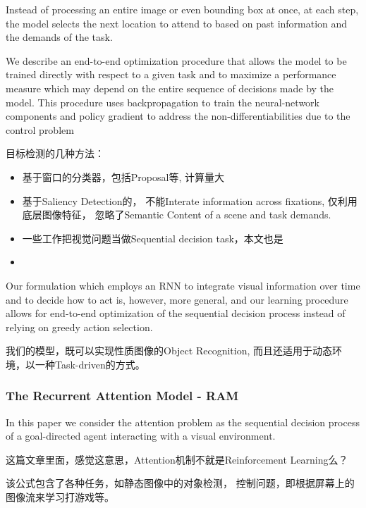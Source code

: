 Instead of processing an entire image or even bounding box at once, at each step, the model
selects the next location to attend to based on past information and the demands of the task.

We describe an end-to-end
optimization procedure that allows the model to be trained directly with respect to a given task and
to maximize a performance measure which may depend on the entire sequence of decisions made by
the model. This procedure uses backpropagation to train the neural-network components and policy
gradient to address the non-differentiabilities due to the control problem

目标检测的几种方法：
\begin{itemize}
\item 基于窗口的分类器，包括Proposal等, 计算量大
\item 基于Saliency Detection的， 不能Interate information across fixations, 仅利用底层图像特征， 忽略了Semantic Content of a scene and task demands.
\item 一些工作把视觉问题当做Sequential decision task，本文也是
\item 
\end{itemize}

Our formulation which employs an RNN to integrate visual
information over time and to decide how to act is, however, more general, and our learning procedure
allows for end-to-end optimization of the sequential decision process instead of relying on greedy
action selection.

我们的模型，既可以实现性质图像的Object Recognition, 而且还适用于动态环境，以一种Task-driven的方式。

\subsubsection{The Recurrent Attention Model - RAM }

In this paper we consider the attention problem as the sequential decision process of a goal-directed
agent interacting with a visual environment.

这篇文章里面，感觉这意思，Attention机制不就是Reinforcement Learning么？

该公式包含了各种任务，如静态图像中的对象检测， 控制问题，即根据屏幕上的图像流来学习打游戏等。

